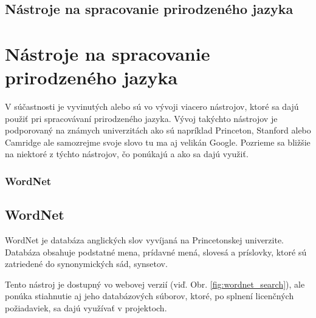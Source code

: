 %
%
{
	\subsection{Nástroje na spracovanie prirodzeného jazyka}
}
{
	\section{Nástroje na spracovanie prirodzeného jazyka}
}
\label{subsec:nlp_nastroje}
V súčastnosti je vyvinutých alebo sú vo vývoji viacero nástrojov, ktoré sa dajú použiť pri spracovávaní prirodzeného jazyka. Vývoj takýchto nástrojov je podporovaný na známych univerzitách ako sú napríklad Princeton, Stanford alebo Camridge ale samozrejme svoje slovo tu ma aj velikán Google. Pozrieme sa bližšie na niektoré z týchto nástrojov, čo ponúkajú a ako sa dajú využiť.

%
%
{
	\subsubsection{WordNet}
}
{
	\subsection{WordNet}
}
\label{subsubsec:wordnet}
WordNet je databáza anglických slov vyvíjaná na Princetonskej univerzite. Databáza obsahuje podstatné mena, prídavné mená, slovesá a príslovky, ktoré sú zatriedené do synonymických sád, synsetov.

Tento nástroj je dostupný vo webovej verzií (viď. Obr. \ref{fig:wordnet_search}), ale ponúka stiahnutie aj jeho databázových súborov, ktoré, po splnení licenčných požiadaviek, sa dajú využívať v projektoch.

